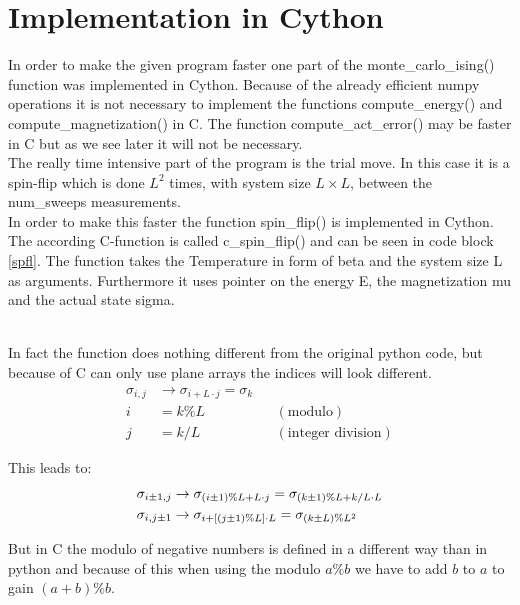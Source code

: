 \section{Implementation in Cython}

In order to make the given program faster one part of the monte\_carlo\_ising() function was implemented in Cython.
Because of the already efficient numpy operations it is not necessary to implement the functions compute\_energy() and compute\_magnetization() in C.
The function compute\_act\_error() may be faster in C but as we see later it will not be necessary.\\

The really time intensive part of the program is the trial move.
In this case it is a spin-flip which is done $L^2$ times, with system size $L\times L$, between the num\_sweeps measurements.\\

In order to make this faster the function spin\_flip() is implemented in Cython.
The according C-function is called c\_spin\_flip() and can be seen in code block \ref{spfl}.
The function takes the Temperature in form of beta and the system size L as arguments. 
Furthermore it uses pointer on the energy E, the magnetization mu and the actual state sigma.\\\


In fact the function does nothing different from the original python code, but because of C can only use plane arrays the indices will look different.
\begin{align}
	\sigma_{i,j}
		&\rightarrow \sigma_{i+L\cdot j} = \sigma_k
		\label{ijk1}\\
	i
		&=k\%L 
		&&(\text{modulo})
		\label{ijk2}\\
	j
		&=k/L
		&&(\text{integer division})
		\label{ijk3} 
\end{align}

This leads to:
\begin{align}
\sigma_{i\pm 1,j}
	&\rightarrow \sigma_{(i\pm 1)\%L+L\cdot j}
	= \sigma_{(k\pm 1)\%L+k/L\cdot L}
	\label{ijk4}\\
\sigma_{i,j\pm 1}
	&\rightarrow \sigma_{i+\left[ (j\pm 1)\%L\right] \cdot L}
	= \sigma_{(k\pm L)\%L^2}
	\label{ijk5}
\end{align}

But in C the modulo of negative numbers is defined in a different way than in python and because of this when using the modulo $a\% b$ we have to add $b$ to $a$ to gain $(a+b)\%b$.\\

